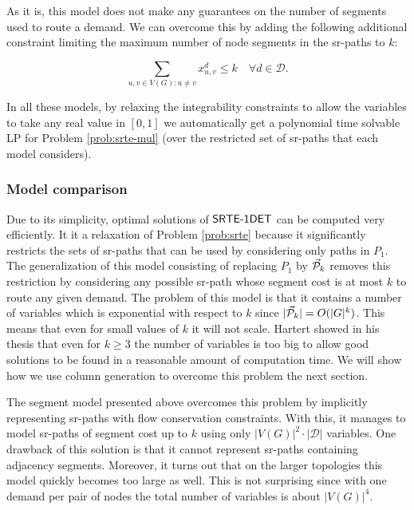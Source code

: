 As it is, this model does not make any guarantees on the number of segments used to route a demand. We can overcome this by adding the following additional constraint
limiting the maximum number of node segments in the sr-paths to $k$:

$$
\sum_{u, v \in V(G) : u \neq v} x^d_{u, v} \leq k \quad \forall d \in \mathcal{D}.
$$

In all these models, by relaxing the integrability constraints to allow the variables to take any real value in $[0, 1]$ we automatically get a polynomial time solvable
LP for Problem \ref{prob:srte-mul} (over the restricted set of sr-paths that each model considers). 

\subsubsection*{Model comparison}

Due to its simplicity, optimal solutions of $\textsf{SRTE-1DET}$ can be computed very efficiently. It it a relaxation of Problem \ref{prob:srte} because it significantly restricts the
sets of sr-paths that can be used by considering only paths in $P_1$. The generalization of this model consisting of replacing $P_1$ by $\mathcal{\vec{P}}_k$ removes this 
restriction by considering any possible sr-path whose segment cost is at most $k$ to route any given demand. The problem of this model is that it contains a number of variables
which is exponential with respect to $k$ since $|\mathcal{\vec{P}}_k| = O(|G|^k)$. This means that even for small values of $k$ it will not scale. Hartert showed in his thesis that even for $k \geq 3$ the number of 
variables is too big to allow good solutions to be found in a reasonable amount of computation time. We will show how we use column generation to overcome this problem the next section.

The segment model presented above overcomes this problem by implicitly representing sr-paths with flow conservation constraints. With this, it manages
to model sr-paths of segment cost up to $k$ using only $|V(G)|^2 \cdot |\mathcal{D}|$ variables. One drawback of this solution is that it
cannot represent sr-paths containing adjacency segments. Moreover, it turns out that on the larger topologies this model quickly becomes too large as well. This is not
surprising since with one demand per pair of nodes the total number of variables is about $|V(G)|^4$.

